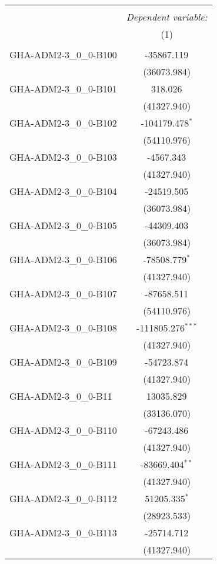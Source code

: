 \begin{table}[!htbp] \centering
\begin{tabular}{@{\extracolsep{5pt}}lc}
\\[-1.8ex]\hline
\hline \\[-1.8ex]
& \multicolumn{1}{c}{\textit{Dependent variable:}} \
\cr \cline{1-2}
\\[-1.8ex] & (1) \\
\hline \\[-1.8ex]
 GHA-ADM2-3_0_0-B100 & -35867.119$^{}$ \\
  & (36073.984) \\
 GHA-ADM2-3_0_0-B101 & 318.026$^{}$ \\
  & (41327.940) \\
 GHA-ADM2-3_0_0-B102 & -104179.478$^{*}$ \\
  & (54110.976) \\
 GHA-ADM2-3_0_0-B103 & -4567.343$^{}$ \\
  & (41327.940) \\
 GHA-ADM2-3_0_0-B104 & -24519.505$^{}$ \\
  & (36073.984) \\
 GHA-ADM2-3_0_0-B105 & -44309.403$^{}$ \\
  & (36073.984) \\
 GHA-ADM2-3_0_0-B106 & -78508.779$^{*}$ \\
  & (41327.940) \\
 GHA-ADM2-3_0_0-B107 & -87658.511$^{}$ \\
  & (54110.976) \\
 GHA-ADM2-3_0_0-B108 & -111805.276$^{***}$ \\
  & (41327.940) \\
 GHA-ADM2-3_0_0-B109 & -54723.874$^{}$ \\
  & (41327.940) \\
 GHA-ADM2-3_0_0-B11 & 13035.829$^{}$ \\
  & (33136.070) \\
 GHA-ADM2-3_0_0-B110 & -67243.486$^{}$ \\
  & (41327.940) \\
 GHA-ADM2-3_0_0-B111 & -83669.404$^{**}$ \\
  & (41327.940) \\
 GHA-ADM2-3_0_0-B112 & 51205.335$^{*}$ \\
  & (28923.533) \\
 GHA-ADM2-3_0_0-B113 & -25714.712$^{}$ \\
  & (41327.940) \\

\end{tabular}
\end{table}
